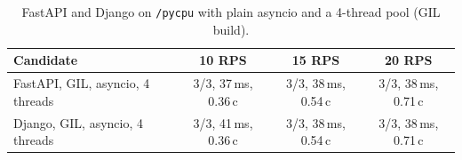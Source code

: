 \begin{table}[t]
\caption{FastAPI and Django on \texttt{/pycpu} with plain asyncio and a 4-thread pool (GIL build).}
\label{tab:frameworks}
\centering\small
\begin{tabular}{lccc}
\toprule
Candidate & 10 RPS & 15 RPS & 20 RPS \\
\midrule
FastAPI, GIL, asyncio, 4 threads & 3/3, 37\,ms, 0.36\,c & 3/3, 38\,ms, 0.54\,c & 3/3, 38\,ms, 0.71\,c \\
Django, GIL, asyncio, 4 threads & 3/3, 41\,ms, 0.36\,c & 3/3, 38\,ms, 0.54\,c & 3/3, 38\,ms, 0.71\,c \\
\bottomrule
\end{tabular}
\end{table}
